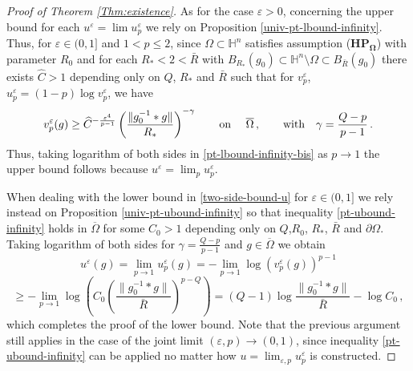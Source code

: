\documentclass[10pt]{amsart}
\numberwithin{equation}{section}
\theoremstyle{definition}
\newcommand{\He}{\mathbb{H}}
\begin{document}
\begin{proof}[Proof of Theorem \ref{Thm:existence}]
As for the case $\varepsilon>0$, concerning the upper bound for each $u^\varepsilon=\lim  u^\varepsilon_p$ we rely on Proposition \ref{univ-pt-lbound-infinity}.  Thus, for $\varepsilon \in (0,1]$ and  $1<p\leq 2$, since $\Omega \subset \He^n$ satisfies assumption  ($\mathbf{HP_\Omega}$) with parameter $R_0$ and  for each $R_\ast<2<\bar{R}$ with $B_{R_\ast}(g_0) \subset \He^n \setminus \Omega \subset B_{\bar{R}}(g_0)$ there exists  $\widehat{C}>1$ depending only on $Q$, $R_\ast$ and $\bar{R}$ such that for $v^\varepsilon_p$, $u^\varepsilon_p=(1-p) \log v^\varepsilon_p$,  we have 
 \begin{equation}
 \label{pt-lbound-infinity-bis}
 v^\varepsilon_p(g) \geq \widehat{C}^{- \frac{\varepsilon^4}{p-1}}     \left( \frac{\| g_0^{-1}*g\|}{R_\ast} \right)^{-\gamma} \qquad \hbox{on } \quad \overline{\Omega} \, , \qquad \hbox{with} \quad \gamma=\frac{Q-p}{p-1} \, .
 \end{equation}
 Thus, taking logarithm of both sides in \eqref{pt-lbound-infinity-bis} as $p \to 1$ the upper bound follows because $u^\varepsilon=\lim_p  u^\varepsilon_p$.

When dealing with the lower bound in \eqref{two-side-bound-u} for $\varepsilon \in (0,1]$ we rely instead on Proposition \ref{univ-pt-ubound-infinity} so that inequality \eqref{pt-ubound-infinity} holds in $\overline{\Omega}$ for some  $C_0>1$ depending only on $Q$,$R_0$, $R_\ast$, $\bar{R}$ and $\partial \Omega$. Taking logarithm of both sides for $\gamma=\frac{Q-p}{p-1}$  and $g\in \overline{\Omega}$ we obtain   
 \[
u^\varepsilon(g)= \lim_{p \to 1} u^\varepsilon_{p}(g) =-\lim_{p \to 1} \log \left(v^\varepsilon_p(g)\right)^{p-1} \]
\[\geq  - \lim_{p\to 1}\log \left({C_0}     \left( \frac{\| g_0^{-1}*g\|}{\bar{R}} \right)^{p-Q} \right)=(Q-1) \log     \frac{\| g_0^{-1}*g\|}{\bar{R}} - \log C_0\,  ,
 \]
 which completes the proof of the lower bound. Note that the previous argument still applies in the case of the joint limit $(\varepsilon,p) \to (0,1)$, since inequality \eqref{pt-ubound-infinity} can be applied no matter how $u= \lim_{\varepsilon, p} u^\varepsilon_p$ is constructed.



\end{proof}
\end{document}
